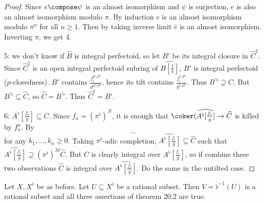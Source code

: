 \documentclass[a4paper]{article}
\newcommand{\tilt}{\flat} %
\begin{document}
\begin{proof}
  Since \(e \compose \psi\) is an almost isomorphism and \(\psi\) is surjection, \(e\) is also an almost isomorphism modulo \(\pi\). By induction \(e\) is an almost isomorphism modulo \(\pi^n\) for all \(n \geq 1\). Then by taking inverse limit \(\hat e\) is an almost isomorphism. Inverting \(\pi\), we get 4.

  5: we don't know if \(\widehat B\) is integral perfectoid, so let \(B'\) be its integral closure in \(\widehat C^\sharp\). Since \(\widehat C^\sharp\) is an open integral perfectoid subring of \(\widehat{B[\frac{1}{\pi}]}\), \(B'\) is integral perfectoid (\(p\)-closedness). \(B'\) contains \(\frac{f_i^{\sharp 1/p^k}}{g^{\sharp 1/p^k}}\), hence its tilt contains \(\frac{f_i^{1/p^k}}{g^{1/p^k}}\). Thus \(B^{'\tilt} \supseteq C\). But \(B^{' \tilt} \subseteq \widehat C\), so \(\widehat C = B^{' \tilt}\). Thus \(\widehat C^\sharp = B'\).

  6: \(A^\tilt[\frac{f_i}{g}] \subseteq C\). Since \(f_n = (\pi^\tilt)^N\), it is enough that \(\coker(\widehat{A^\tilt[\frac{f_i}{g}]} \to \widehat C\) is killed by \(f_n^n\). By
  \[
    ...
  \]
  for any \(k_1, \dots, k_n \geq 0\). Taking \(\pi^\tilt\)-adic completion, \(\widehat{A^\tilt[\frac{f_i}{g}]} \subseteq \widehat C\) such that \(\widehat{A^\tilt[\frac{f_i}{g}]} \supseteq (\pi^\tilt)^M \widehat C\). But \(C\) is clearly integral over \(A^\tilt[\frac{f_i}{g}]\), so if combine these two observations \(\widehat C\) is integral over \(\widehat{A^\tilt[\frac{f_i}{g}]}\). Do the same in the untilted case.
\end{proof}

\begin{corollary}
  Let \(X, X^\tilt\) be as before. Let \(U \subseteq X^\tilt\) be a rational subset. Then \(V = \tilt^{-1}(U)\) is a rational subset and all three assertions of theorem 20.2 are true.
\end{corollary}
\end{document}

